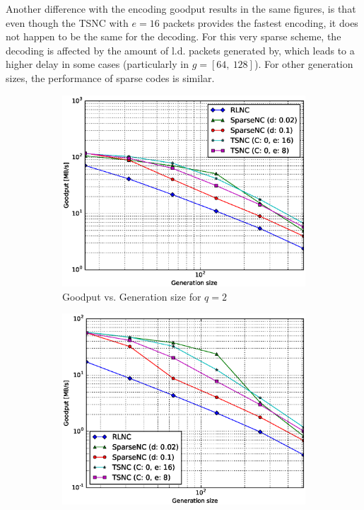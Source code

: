 Another difference with the encoding goodput results in the same figures,
is that even though the \ac{TSNC} with $e = 16$ packets provides the fastest
encoding, it does not happen to be the same for the decoding. For this
very sparse scheme, the decoding is affected by the amount of \ac{l.d.}
packets generated by, which leads to a higher delay in some cases
(particularly in $g = [64,\ 128]$). For other generation sizes, the
performance of sparse codes is similar.
%
\begin{figure}
    \centering
    \begin{subfigure}[b]{0.475\textwidth}
        \centering
        \includegraphics[width=1.15\textwidth]{images/06_06_2016/goodput_vs_generation_size_Rasp_v2_decoder_Binary_1600.eps}
        \caption[]%
        {{\small Goodput vs. Generation size for $q = 2$}}
        \label{fig:dec_good_rasp2_gen_gf2}
    \end{subfigure}
    \hfill
    \begin{subfigure}[b]{0.475\textwidth}
        \centering
        \includegraphics[width=1.15\textwidth]{images/06_06_2016/goodput_vs_generation_size_Rasp_v2_decoder_Binary8_1600.eps}

\end{subfigure}
\end{figure}

